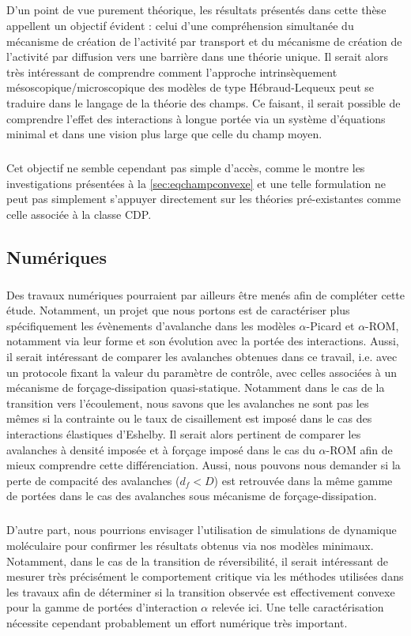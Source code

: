 \subparagraph{}D'un point de vue purement théorique, les résultats présentés dans cette thèse appellent un objectif évident : celui d'une compréhension simultanée du mécanisme de création de l'activité par transport et du mécanisme de création de l'activité par diffusion vers une barrière dans une théorie unique. Il serait alors très intéressant de comprendre comment l'approche intrinsèquement mésoscopique/microscopique des modèles de type Hébraud-Lequeux peut se traduire dans le langage de la théorie des champs. Ce faisant, il serait possible de comprendre l'effet des interactions à longue portée via un système d'équations minimal et dans une vision plus large que celle du champ moyen.

\subparagraph{}Cet objectif ne semble cependant pas simple d'accès, comme le montre les investigations présentées à la \autoref{sec:eqchampconvexe} et une telle formulation ne peut pas simplement s'appuyer directement sur les théories pré-existantes comme celle associée à la classe CDP.

\subsection*{Numériques}

\subparagraph{}Des travaux numériques pourraient par ailleurs être menés afin de compléter cette étude. Notamment, un projet que nous portons est de caractériser plus spécifiquement les évènements d'avalanche dans les modèles $\alpha$-Picard et $\alpha$-ROM, notamment via leur forme \cite{wiese_theory_2022} et son évolution avec la portée des interactions. Aussi, il serait intéressant de comparer les avalanches obtenues dans ce travail, i.e. avec un protocole fixant la valeur du paramètre de contrôle, avec celles associées à un mécanisme de forçage-dissipation quasi-statique. Notamment dans le cas de la transition vers l'écoulement, nous savons que les avalanches ne sont pas les mêmes si la contrainte ou le taux de cisaillement est imposé dans le cas des interactions élastiques d'Eshelby. Il serait alors pertinent de comparer les avalanches à densité imposée et à forçage imposé dans le cas du $\alpha$-ROM afin de mieux comprendre cette différenciation. Aussi, nous pouvons nous demander si la perte de compacité des avalanches ($d_f < D$) est retrouvée dans la même gamme de portées dans le cas des avalanches sous mécanisme de forçage-dissipation.

\subparagraph{}D'autre part, nous pourrions envisager l'utilisation de simulations de dynamique moléculaire pour confirmer les résultats obtenus via nos modèles minimaux. Notamment, dans le cas de la transition de réversibilité, il serait intéressant de mesurer très précisément le comportement critique via les méthodes utilisées dans les travaux \cite{metzger_irreversibility_2010, ge_rheology_2022} afin de déterminer si la transition observée est effectivement convexe pour la gamme de portées d'interaction $\alpha$ relevée ici. Une telle caractérisation nécessite cependant probablement un effort numérique très important.

